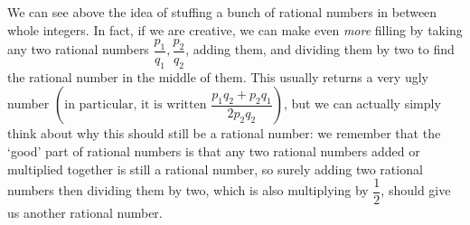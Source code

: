 \documentclass[openany]{book}
\begin{document}
We can see above the idea of stuffing a bunch of rational numbers in between whole integers. In fact, if we are creative, we can make even \textit{more} filling by taking any two rational numbers $\dfrac{p_{1}}{q_{1}},\dfrac{p_{2}}{q_{2}}$, adding them, and dividing them by two to find the rational number in the middle of them. This usually returns a very ugly number $\left(\text{in particular, it is written }\dfrac{p_{1}q_{2}+p_{2}q_{1}}{2p_{2}q_{2}}\right)$, but we can actually simply think about why this should still be a rational number: we remember that the `good' part of rational numbers is that any two rational numbers added or multiplied together is still a rational number, so surely adding two rational numbers then dividing them by two, which is also multiplying by $\dfrac{1}{2}$, should give us another rational number.
\end{document}
